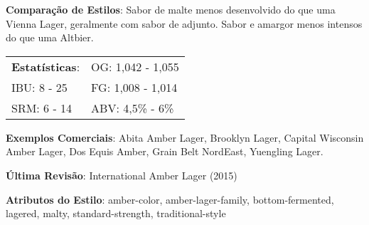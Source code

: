 \textbf{Comparação de Estilos}: Sabor de malte menos desenvolvido do que uma Vienna Lager, geralmente com sabor de adjunto. Sabor e amargor menos intensos do que uma Altbier.

\begin{tabular}{@{}p{35mm}p{35mm}@{}}
  \textbf{Estatísticas}: & OG: 1,042 - 1,055 \\
  IBU: 8 - 25 & FG: 1,008 - 1,014 \\
  SRM: 6 - 14 & ABV: 4,5\% - 6\%
\end{tabular}

\textbf{Exemplos Comerciais}: Abita Amber Lager, Brooklyn Lager, Capital Wisconsin Amber Lager, Dos Equis Amber, Grain Belt NordEast, Yuengling Lager.

\textbf{Última Revisão}: International Amber Lager (2015)

\textbf{Atributos do Estilo}: amber-color, amber-lager-family, bottom-fermented, lagered, malty, standard-strength, traditional-style